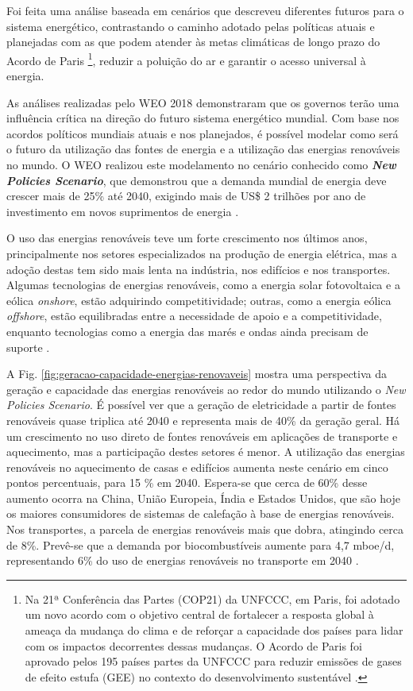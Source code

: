 Foi feita uma análise baseada em cenários que descreveu diferentes futuros 
para o sistema energético, contrastando o caminho adotado pelas políticas atuais e planejadas 
com as que podem atender às metas climáticas de longo prazo do Acordo de Paris \footnote{Na 21ª 
Conferência das Partes (COP21) da UNFCCC, em Paris, foi adotado um novo acordo com o objetivo 
central de fortalecer a resposta global à ameaça da mudança do clima e de reforçar a capacidade dos 
países para lidar com os impactos decorrentes dessas mudanças. O Acordo de Paris foi aprovado pelos 
195 países partes da UNFCCC para reduzir emissões de gases de efeito estufa (GEE) no contexto do 
desenvolvimento sustentável \cite{MME}.}, reduzir a poluição do ar e garantir o acesso universal à energia.

As análises realizadas pelo WEO 2018 demonstraram que os governos terão uma influência crítica na 
direção do futuro sistema energético mundial. Com base nos acordos políticos mundiais atuais e nos 
planejados, é possível modelar como será o futuro da utilização das fontes de energia e a 
utilização das energias renováveis no mundo. 
O WEO realizou este modelamento no cenário conhecido como \textit{\textbf{New Policies Scenario}}, 
que demonstrou que a demanda mundial de energia deve crescer mais de 25\% até 2040, exigindo mais de US\$ 2 trilhões por ano de investimento em novos suprimentos de energia \cite{WEO2018}.

O uso das energias renováveis teve um forte crescimento nos últimos anos, principalmente nos setores
especializados na produção de energia elétrica, mas a adoção destas 
tem sido mais lenta na indústria, nos edifícios e nos transportes.
Algumas tecnologias de energias renováveis, como a energia solar fotovoltaica e a 
eólica \textit{onshore}, estão adquirindo competitividade; outras, como a 
energia eólica \textit{offshore}, estão equilibradas entre a necessidade de apoio e a 
competitividade, enquanto tecnologias como a energia das marés e ondas 
ainda precisam de suporte \cite{WEO2018}.

A Fig. \ref{fig:geracao-capacidade-energias-renovaveis} mostra uma perspectiva da geração e capacidade 
das energias renováveis ao redor do mundo utilizando o \textit{New Policies Scenario}. 
É possível ver que a geração de eletricidade a partir de fontes renováveis quase 
triplica até 2040 e representa mais de 40\% da geração geral.
Há um crescimento no uso direto de fontes renováveis em aplicações de transporte e aquecimento, 
mas a participação destes setores é menor.
A utilização das energias renováveis no aquecimento de casas e edifícios aumenta neste 
cenário em cinco pontos percentuais, para 15 \% em 2040.
Espera-se que cerca de 60\% desse aumento ocorra na China, União Europeia, Índia e Estados Unidos, 
que são hoje os maiores consumidores de sistemas de calefação à base de energias renováveis.
Nos transportes, a parcela de energias renováveis mais que dobra, atingindo cerca de 8\%. 
Prevê-se que a demanda por biocombustíveis aumente para 4,7 mboe/d, representando 6\% do uso 
de energias renováveis no transporte em 2040 \cite{WEO2018}.


